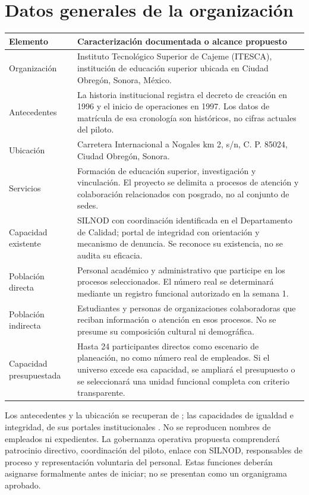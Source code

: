 \documentclass[12pt,letterpaper,oneside]{article}
\begin{document}
\section{Datos generales de la organización}
\begin{longtable}{@{}L{.25\textwidth}L{.70\textwidth}@{}}
\toprule \textbf{Elemento} & \textbf{Caracterización documentada o alcance propuesto} \\
\midrule\endhead
Organización & Instituto Tecnológico Superior de Cajeme (ITESCA), institución de educación superior ubicada en Ciudad Obregón, Sonora, México. \\
Antecedentes & La historia institucional registra el decreto de creación en 1996 y el inicio de operaciones en 1997. Los datos de matrícula de esa cronología son históricos, no cifras actuales del piloto. \\
Ubicación & Carretera Internacional a Nogales km 2, s/n, C. P. 85024, Ciudad Obregón, Sonora. \\
Servicios & Formación de educación superior, investigación y vinculación. El proyecto se delimita a procesos de atención y colaboración relacionados con posgrado, no al conjunto de sedes. \\
Capacidad existente & SILNOD con coordinación identificada en el Departamento de Calidad; portal de integridad con orientación y mecanismo de denuncia. Se reconoce su existencia, no se audita su eficacia. \\
Población directa & Personal académico y administrativo que participe en los procesos seleccionados. El número real se determinará mediante un registro funcional autorizado en la semana 1. \\
Población indirecta & Estudiantes y personas de organizaciones colaboradoras que reciban información o atención en esos procesos. No se presume su composición cultural ni demográfica. \\
Capacidad presupuestada & Hasta 24 participantes directos como escenario de planeación, no como número real de empleados. Si el universo excede esa capacidad, se ampliará el presupuesto o se seleccionará una unidad funcional completa con criterio transparente. \\
\bottomrule
\end{longtable}
Los antecedentes y la ubicación se recuperan de \textcite{fga10historia}; las capacidades de igualdad e integridad, de sus portales institucionales \parencite{fga10igualdad,fga10integridad}. No se reproducen nombres de empleados ni expedientes. La gobernanza operativa propuesta comprenderá patrocinio directivo, coordinación del piloto, enlace con SILNOD, responsables de proceso y representación voluntaria del personal. Estas funciones deberán asignarse formalmente antes de iniciar; no se presentan como un organigrama aprobado.
\end{document}
